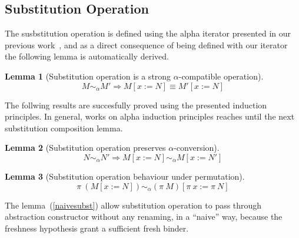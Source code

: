 \documentclass[preprint,10pt]{sigplanconf}
\newcommand{\lam}{\ensuremath{\lambda}}
\newcommand{\alpsym}{\ensuremath{\sim_\alpha}}
\newcommand{\conc}{\ensuremath{+\!\!+}}
\newtheorem{lemma}{Lemma}
\begin{document}
\subsection{Substitution Operation} 

The susbstitution operation is defined using the alpha iterator presented in our previous work~\cite{CopelloTSBF16}, and as a direct consequence of  being defined with our iterator the following lemma is automatically derived.


\begin{lemma}[Substitution operation is a strong $\alpha$-compatible operation]
   \label{substlemma1}
  \[ M \alpsym M' \Rightarrow M [x := N] \equiv M' [x := N] \]
\end{lemma}

The follwing results are succesfully proved using the presented induction principles. In general, works on alpha induction principles reaches until the next substitution composition lemma.

\begin{lemma}[Substitution operation preserves $\alpha$-conversion]
   \label{substlemma2}
  \[ N \alpsym N' \Rightarrow M [x := N] \alpsym M [x := N'] \]
\end{lemma}

\begin{lemma}[Substitution operation behaviour under permutation]
   \label{substPerm}
  \[ \pi\ (M [x := N])  \alpsym (\pi\ M) [ \pi\ x := \pi\ N ] \]
\end{lemma}



The lemma~(\ref{naivesubst}) allow substitution operation to pass through abstraction constructor without any renaming, in a ``naive'' way, because the freshness hypothesis grant a sufficient fresh binder.
\end{document}
